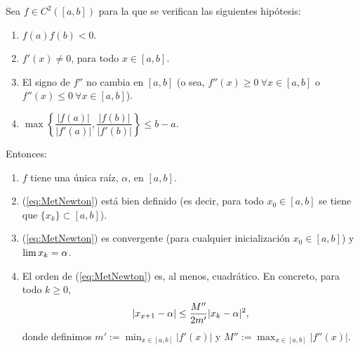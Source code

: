 \begin{theorem}
  Sea $f\in C^2([a,b])$ para la que se verifican las siguientes
  hipótesis:
  \begin{enumerate}[label=($N_{\arabic*}$)]
  \item $f(a)f(b)<0$.
    \label{item:Newton.H1}
  \item  $f'(x)\neq 0$, para todo $x \in [a,b]$.
    \label{item:Newton.H2}    
  \item 
    El signo de $f''$ no cambia en $[a,b]$ (o sea,
      $f''(x)\ge 0 \ \forall x\in [a,b]$ o $f''(x)\le 0 \ \forall x\in [a,b]$).
    \label{item:Newton.H3}
  \item
    $\max\left\{ \dfrac{|f(a)|}{|f'(a)|}, \dfrac{|f(b)|}{|f'(b)|}
    \right\} \le b-a.$
    \label{item:Newton:H4}
  \end{enumerate}
  Entonces:
  \begin{enumerate}
  \item $f$ tiene una única raíz, $\alpha$, en $[a,b]$.
  \item (\ref{eq:MetNewton}) está bien definido (es decir, para todo
    $x_0\in [a,b]$ se tiene que $\{x_k\} \subset [a,b]$).
  \item (\ref{eq:MetNewton}) es convergente (para cualquier
    inicialización $x_0\in [a,b]$) y $\lim x_k = \alpha$.
  \item El orden de (\ref{eq:MetNewton}) es, al menos, cuadrático. En
    concreto, para todo $k\ge 0$,
    \begin{equation}
      |x_{x+1} - \alpha| \le \frac {M''}{2m'} |x_k-\alpha|^2, 
      \label{eq:Newton.orden.2}    
    \end{equation}
    donde definimos $m':=\min_{x\in[a,b]} |f'(x)|$ y $M'':=\max_{x\in[a,b]}|f''(x)|$.
  \end{enumerate}
  \label{thm:Newton.convergencia.global}  
\end{theorem}

